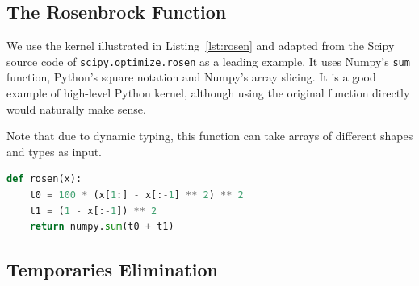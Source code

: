 \documentclass[10pt, preprint, nocopyrightspace]{sigplanconf}
\begin{document}

\subsection{The Rosenbrock Function}

We use the kernel illustrated in Listing~\ref{lst:rosen} and adapted from the
Scipy source code of \texttt{scipy.optimize.rosen} as a leading example. It
uses Numpy's \texttt{sum} function, Python's square notation and Numpy's array
slicing. It is a good example of high-level Python kernel, although using the
original function directly would naturally make sense.

Note that due to dynamic typing, this function can take arrays of different
shapes and types as input.

\begin{lstlisting}[language=python, caption={High-level implementation of the Rosenbrock function in Numpy.}, label={lst:rosen}]
def rosen(x):
    t0 = 100 * (x[1:] - x[:-1] ** 2) ** 2
    t1 = (1 - x[:-1]) ** 2
    return numpy.sum(t0 + t1)
\end{lstlisting}


\subsection{Temporaries Elimination}
\label{sec:temporaries-elimination}
\end{document}
